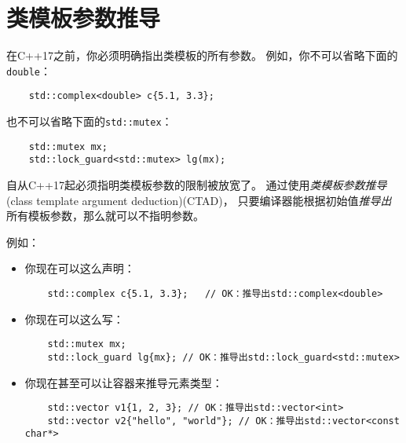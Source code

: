 \section{类模板参数推导}\label{ch9}
在C++17之前，你必须明确指出类模板的所有参数。
例如，你不可以省略下面的\texttt{double}：
\begin{lstlisting}
    std::complex<double> c{5.1, 3.3};
\end{lstlisting}
也不可以省略下面的\texttt{std::mutex}：
\begin{lstlisting}
    std::mutex mx;
    std::lock_guard<std::mutex> lg(mx);
\end{lstlisting}
自从C++17起必须指明类模板参数的限制被放宽了。
通过使用\emph{类模板参数推导}(class template argument deduction)(CTAD)，
只要编译器能根据初始值\emph{推导出}所有模板参数，那么就可以不指明参数。

例如：
\begin{itemize}[leftmargin=*]
    \item 你现在可以这么声明：
    \begin{lstlisting}
    std::complex c{5.1, 3.3};   // OK：推导出std::complex<double>
    \end{lstlisting}
    \item 你现在可以这么写：
    \begin{lstlisting}
    std::mutex mx;
    std::lock_guard lg{mx}; // OK：推导出std::lock_guard<std::mutex>
    \end{lstlisting}
    \item 你现在甚至可以让容器来推导元素类型：
    \begin{lstlisting}
    std::vector v1{1, 2, 3}; // OK：推导出std::vector<int>
    std::vector v2{"hello", "world"}; // OK：推导出std::vector<const char*>
    \end{lstlisting}
\end{itemize}

